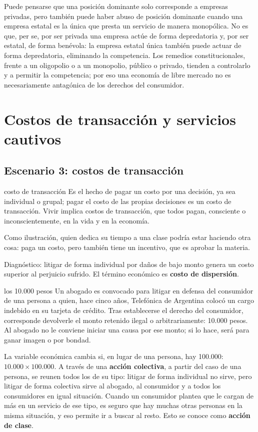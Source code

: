 \documentclass[12pt,oneside]{book}
\begin{document}
Puede pensarse que una posici\'on dominante solo corresponde a empresas privadas, pero tambi\'en puede haber abuso de posici\'on dominante cuando una empresa estatal es la \'unica que presta un servicio de manera monop\'olica. No es que, per se, por ser privada una empresa act\'ue de forma depredatoria y, por ser estatal, de forma ben\'evola: la empresa estatal \'unica tambi\'en puede actuar de forma depredatoria, eliminando la competencia. Los remedios constitucionales, frente a un oligopolio o a un monopolio, p\'ublico o privado, tienden a controlarlo y a permitir la competencia; por eso una econom\'ia de libre mercado no es necesariamente antag\'onica de los derechos del consumidor.

\section{Costos de transacci\'on y servicios cautivos}

\subsection{Escenario 3: costos de transacci\'on}

\begin{definition}{costo de transacci\'on}
Es el hecho de pagar un costo por una decisi\'on, ya sea individual o grupal; pagar el costo de las propias decisiones es un costo de transacci\'on. Vivir implica costos de transacci\'on, que todos pagan, consciente o inconscientemente, en la vida y en la econom\'ia.
\end{definition}

Como ilustraci\'on, quien dedica su tiempo a una clase podr\'ia estar haciendo otra cosa: paga un costo, pero tambi\'en tiene un incentivo, que es aprobar la materia.

Diagn\'ostico: litigar de forma individual por da\~nos de bajo monto genera un costo superior al perjuicio sufrido. El t\'ermino econ\'omico es \textbf{costo de dispersi\'on}.

\begin{example}{los 10.000 pesos}
Un abogado es convocado para litigar en defensa del consumidor de una persona a quien, hace cinco a\~nos, Telef\'onica de Argentina coloc\'o un cargo indebido en su tarjeta de cr\'edito. Tras establecerse el derecho del consumidor, corresponde devolverle el monto retenido ilegal o arbitrariamente: 10.000 pesos. Al abogado no le conviene iniciar una causa por ese monto; si lo hace, ser\'a para ganar imagen o por bondad.

La variable econ\'omica cambia si, en lugar de una persona, hay 100.000: $10.000 \times 100.000$. A trav\'es de una \textbf{acci\'on colectiva}, a partir del caso de una persona, se reunen todos los de su tipo: litigar de forma individual no sirve, pero litigar de forma colectiva sirve al abogado, al consumidor y a todos los consumidores en igual situaci\'on. Cuando un consumidor plantea que le cargan de m\'as en un servicio de ese tipo, es seguro que hay muchas otras personas en la misma situaci\'on, y eso permite ir a buscar al resto. Esto se conoce como \textbf{acci\'on de clase}.
\end{example}
\end{document}
